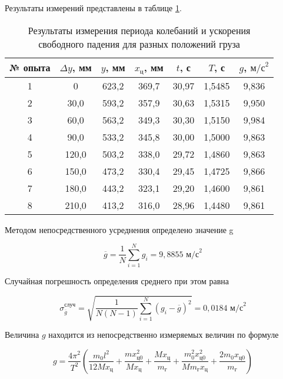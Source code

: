 \documentclass[a4paper,12pt]{article} %
\begin{document}
Результаты измерений представлены в таблице \ref{tab1}.

\begin{table}[]
    \centering
    \begin{tabular}{c|c|c|c|c|c|c}
        № опыта & $ \Delta y $, мм & $ y $, мм & $ x_\text{ц} $, мм & $ t $, с & $ T $, с & $ g $, $ \text{м/с}^2 $ \\ \hline
        1 & 0 & 623,2 & 369,7 & 30,97 & 1,5485 & 9,836 \\
        2 & 30,0 & 593,2 & 357,9 & 30,63 & 1,5315 & 9,950 \\
        3 & 60,0 & 563,2 & 349,3 & 30,30 & 1,5150 & 9,984 \\
        4 & 90,0 & 533,2 & 345,8 & 30,00 & 1,5000 & 9,863 \\
        5 & 120,0 & 503,2 & 338,0 & 29,72 & 1,4860 & 9,863 \\
        6 & 150,0 & 473,2 & 330,4 & 29,45 & 1,4725 & 9,866 \\
        7 & 180,0 & 443,2 & 323,1 & 29,20 & 1,4600 & 9,861 \\
        8 & 210,0 & 413,2 & 316,0 & 28,96 & 1,4480 & 9,861 \\
    \end{tabular}
    \caption{Результаты измерения периода колебаний и ускорения свободного падения для разных положений груза}
    \label{tab1}
\end{table}

Методом непосредственного усреднения определено значение g

\begin{equation}
    \overline{g} = \frac{1}{N} \sum_{i=1}^{N} g_i = 9,8855 \text{ м/с}^2
\end{equation}

Случайная погрешность определения среднего при этом равна

\begin{equation}
    \sigma_{\overline{g}}^{\text{случ}} =\sqrt{\frac{1}{N(N-1)}\sum_{i=1}^{N}(g_i-\overline{g})^2} = 0,0184 \text{ м/с}^2
\end{equation}

Величина $ g $ находится из непосредственно измеряемых величин по формуле

\begin{equation}
    g = \frac{4\pi^2}{T^2} ( \frac{m_0l^2}{12Mx_\text{ц}} + \frac{mx_\text{ц0}^2}{Mx_\text{ц}} + \frac{Mx_\text{ц}}{m_\text{г}} + \frac{m_0^2x_\text{ц0}^2}{Mm_\text{г}x_\text{ц}} + \frac{2m_0x_\text{ц0}}{m_\text{г}} )
\end{equation}
\end{document}
